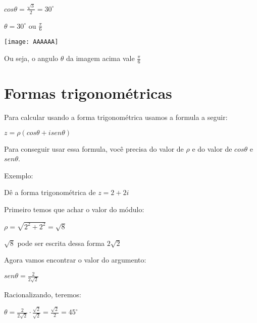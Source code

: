 \documentclass[]{article}
\begin{document}
\begin{large}
\begin{flushleft}
\begin{center}
    $cos\theta=\frac{\sqrt{3}}{2}=30^{\circ}$
\end{center}

\begin{center}
    $\theta=30^{\circ}$ ou $\frac{\pi}{6}$
\end{center}

\texttt{[image: AAAAAA]}

Ou seja, o angulo $\theta$ da imagem acima vale $\frac{\pi}{6}$ \vspace{.3cm}

\section{Formas trigonométricas}

Para calcular usando a forma trigonométrica usamos a formula a seguir: \vspace{.3cm}

\begin{center}
    $z=\rho(cos\theta + isen\theta)$ \vspace{.3cm}
\end{center}

Para conseguir usar essa formula, você precisa do valor de $\rho$ e do valor de $cos\theta$ e $sen\theta$. \vspace{.3cm}

Exemplo: \vspace{.3cm}

Dê a forma trigonométrica de $z=2+2i$

Primeiro temos que achar o valor do módulo: \vspace{.3cm}

\begin{center}
    $\rho=\sqrt{2^2+2^2} = \sqrt{8}$
    
    $\sqrt{8}$ pode ser escrita dessa forma $2\sqrt{2}$ \vspace{.3cm}
\end{center}

Agora vamos encontrar o valor do argumento: \vspace{.3cm}

\begin{center}
    $sen\theta=\frac{2}{2\sqrt{2}}$
\end{center}

Racionalizando, teremos: \vspace{.3cm}

\begin{center}
    $\theta=\frac{2}{2\sqrt{2}} \cdot \frac{\sqrt{2}}{\sqrt{2}} = \frac{\sqrt{2}}{2} = 45^\circ$ \vspace{.3cm}
\end{center}


\end{flushleft}
\end{large}
\end{document}
